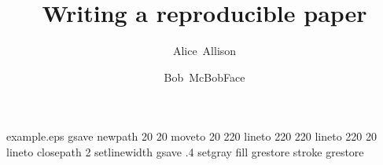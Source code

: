 %
%
%
%
%
\begin{filecontents*}{example.eps}
    gsave
    newpath
    20 20 moveto
    20 220 lineto
    220 220 lineto
    220 20 lineto
    closepath
    2 setlinewidth
    gsave
    .4 setgray fill
    grestore
    stroke
    grestore
\end{filecontents*}
%
\RequirePackage{fix-cm}
%
\documentclass[smallextended,twocolumn]{svjour3}          %
%
\smartqed  %
\usepackage{graphicx}
\usepackage{natbib}


\usepackage{amsmath}
\usepackage{textcomp}
\usepackage{booktabs}
\usepackage{units}
\usepackage{hyperref}
\usepackage{wrapfig}
\usepackage{csvsimple}






\onecolumn
\title{Writing a reproducible paper}

\author{%
  Alice~Allison \and Bob~McBobFace\\}

